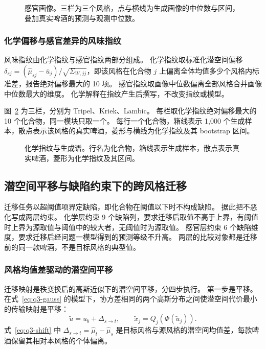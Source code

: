 \begin{figure}[htbp]\centering
{}
\caption{感官画像。三栏为三个风格，点与横线为生成画像的中位数与区间，叠加真实啤酒的预测与观测中位数。}
\label{fig:q3-portrait}
\end{figure}

\subsubsection{化学偏移与感官差异的风味指纹}

风味指纹由化学指纹与感官指纹两部分组成。
化学指纹取标准化潜空间偏移 $\delta_{sj}=(\hat\mu_{sj}-\bar u_j)/\sqrt{\Sigma_{W,jj}}$，即该风格在化合物 $j$ 上偏离全体均值多少个风格内标准差，报告绝对偏移最大的 10 项。
感官指纹取画像中位数偏离全部风格合并画像中位数最大的维度。
化学解释在指纹产生后撰写，不改变指纹或模型。

图~\ref{fig:q3-fingerprint} 为三栏，分别为 Tripel、Kriek、Lambic。
每栏取化学指纹绝对偏移最大的 10 个化合物，同一模块只取一个。
每行一个化合物，箱线表示 1,000 个生成样本，散点表示该风格的真实啤酒，菱形与横线为化学指纹及其 bootstrap 区间。

\begin{figure}[htbp]\centering
{}
\caption{化学指纹与生成谱。行名为化合物，箱线表示生成样本，散点表示真实啤酒，菱形为化学指纹及其区间。}
\label{fig:q3-fingerprint}
\end{figure}

\subsection{潜空间平移与缺陷约束下的跨风格迁移}

迁移任务以超阈值项界定缺陷，即化合物在阈值以下时不构成缺陷。
据此把不恶化写成两层约束。
化学层约束 9 个缺陷列，要求迁移后取值不高于上界，有阈值时上界为源取值与阈值中的较大者，无阈值时为源取值。
感官层约束 6 个缺陷维度，要求迁移后经问题一模型得到的预测等级不升高。
两层的比较对象都是迁移前的同一款啤酒，不是目标风格的典型值。

\subsubsection{风格均值差驱动的潜空间平移}

迁移映射是秩变换后的高斯近似下的潜空间平移，分四步执行。
第一步是平移。
在式~\eqref{eq:q3-gauss} 的模型下，协方差相同的两个高斯分布之间使潜空间代价最小的传输映射是平移：
\begin{equation}\label{eq:q3-shift}
\tilde u=u_b+\Delta_{s\to t},\qquad \tilde x_j=Q_j(\Phi(\tilde u_j)) .
\end{equation}
式~\eqref{eq:q3-shift} 中 $\Delta_{s\to t}=\hat\mu_t-\hat\mu_s$ 是目标风格与源风格的潜空间均值差，每款啤酒保留其相对本风格的个体偏离。

